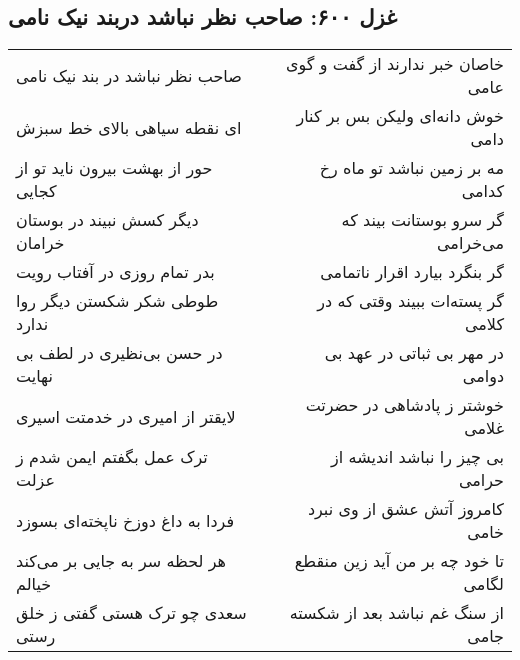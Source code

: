 \begin{center}
\section*{غزل ۶۰۰: صاحب نظر نباشد دربند نیک نامی}
\label{sec:600}
\begin{longtable}{l p{0.5cm} r}
صاحب نظر نباشد در بند نیک نامی
&&
خاصان خبر ندارند از گفت و گوی عامی
\\
ای نقطه سیاهی بالای خط سبزش
&&
خوش دانه‌ای ولیکن بس بر کنار دامی
\\
حور از بهشت بیرون ناید تو از کجایی
&&
مه بر زمین نباشد تو ماه رخ کدامی
\\
دیگر کسش نبیند در بوستان خرامان
&&
گر سرو بوستانت بیند که می‌خرامی
\\
بدر تمام روزی در آفتاب رویت
&&
گر بنگرد بیارد اقرار ناتمامی
\\
طوطی شکر شکستن دیگر روا ندارد
&&
گر پسته‌ات ببیند وقتی که در کلامی
\\
در حسن بی‌نظیری در لطف بی نهایت
&&
در مهر بی ثباتی در عهد بی دوامی
\\
لایقتر از امیری در خدمتت اسیری
&&
خوشتر ز پادشاهی در حضرتت غلامی
\\
ترک عمل بگفتم ایمن شدم ز عزلت
&&
بی چیز را نباشد اندیشه از حرامی
\\
فردا به داغ دوزخ ناپخته‌ای بسوزد
&&
کامروز آتش عشق از وی نبرد خامی
\\
هر لحظه سر به جایی بر می‌کند خیالم
&&
تا خود چه بر من آید زین منقطع لگامی
\\
سعدی چو ترک هستی گفتی ز خلق رستی
&&
از سنگ غم نباشد بعد از شکسته جامی
\\
\end{longtable}
\end{center}
